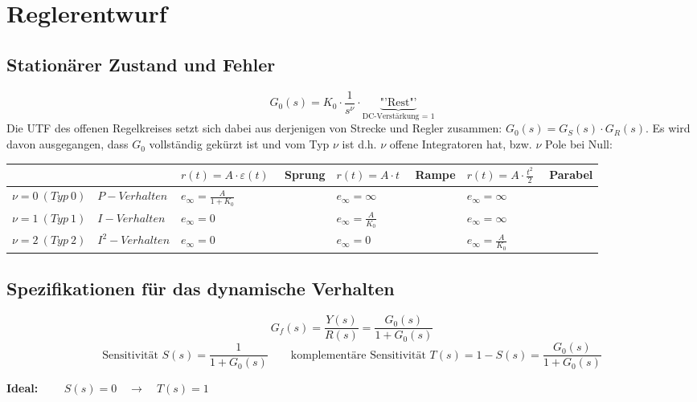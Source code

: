 \section{Reglerentwurf }
\subsection{Stationärer Zustand und Fehler }
\[ G_0(s) = K_0 \cdot \frac{1}{s^{\nu}} \cdot \underbrace{\text{"'Rest"'}}_\textrm{DC-Verstärkung = 1} \]
Die UTF des offenen Regelkreises setzt sich dabei aus derjenigen von Strecke
und Regler zusammen: $G_0(s) = G_S(s)\cdot G_R(s)$. Es wird davon ausgegangen, dass $G_0$
vollständig gekürzt ist und vom Typ $\nu$ ist d.h. $\nu$ offene Integratoren hat, bzw. $\nu$ Pole
bei Null:
\begin{table}[h!]
	\begin{tabularx}{\textwidth}{|l||X|X|X|}
	\hline
		& $r(t)=A\cdot\varepsilon(t) \quad $ Sprung & $r(t)=A\cdot t \quad$ Rampe & $r(t)=A\cdot \frac{t^2}{2} \quad$ Parabel \\ 
		\hline\hline
		$\nu =0 \ (Typ \ 0) \quad P-Verhalten$ & $e_\infty=\frac{A}{1+K_0}$ & $e_\infty=\infty$ & $e_\infty=\infty$ \\ \hline
		$\nu =1 \ (Typ \ 1) \quad  I-Verhalten$ & $e_\infty=0$ & $e_\infty=\frac{A}{K_0}$ & $e_\infty=\infty$ \\ \hline
		$\nu =2 \ (Typ \ 2) \quad  I^2-Verhalten$ & $e_\infty=0$ & $e_\infty=0$ & $e_\infty=\frac{A}{K_0}$ \\ \hline
	\end{tabularx}
\end{table}
\subsection{Spezifikationen für das dynamische Verhalten }
\begin{equation*} 
	G_f(s)=\frac{Y(s)}{R(s)}=\frac{G_0(s)}{1+G_0(s)}
\end{equation*}
\begin{equation*}
	 \text{Sensitivität } S(s)=\frac{1}{1+G_0(s)} \qquad \text{komplementäre Sensitivität } T(s)=1-S(s)=\frac{G_0(s)}{1+G_0(s)}
\end{equation*}

\begin{center}
	\textbf{Ideal:} $\qquad S(s) = 0 \quad \rightarrow \quad T(s) =1 $
\end{center}

